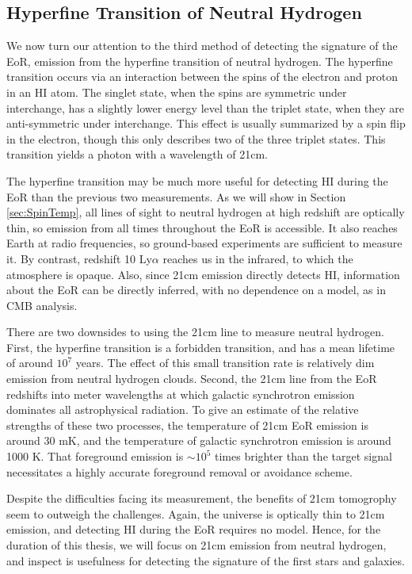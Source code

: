\subsection{Hyperfine Transition of Neutral Hydrogen}

We now turn our attention to the third method of detecting the signature of the EoR, emission from the
hyperfine transition of neutral hydrogen. The hyperfine transition occurs via an
interaction between the spins of the electron and proton in an HI atom. The singlet state, when the
spins are symmetric under interchange, has a slightly lower energy level than the triplet state, when
they are anti-symmetric under interchange. This effect is usually summarized by a spin flip in the
electron, though this only describes two of the three triplet states. This transition
yields a photon with a wavelength of 21cm.

The hyperfine transition may be much more useful for detecting HI during the EoR than the previous 
two measurements. As we will show in Section \ref{sec:SpinTemp}, all lines of sight to
neutral hydrogen at high redshift are optically thin, so emission from all times throughout the EoR
is accessible. It also reaches Earth at radio frequencies, so ground-based experiments are
sufficient to measure it. By contrast, redshift 10 Ly$\alpha$ reaches us in the infrared, to
which the atmosphere is opaque. Also, since 21cm emission directly detects HI,
information about the EoR can be directly inferred, with no dependence on a model, as in CMB
analysis.

There are two downsides to using the 21cm line to measure neutral hydrogen. First, the hyperfine
transition is a forbidden transition, and has a mean lifetime of around $10^7$ years. The effect of
this small transition rate is relatively dim emission from neutral hydrogen clouds. Second, the
21cm line from the EoR redshifts into meter wavelengths at which galactic synchrotron emission
dominates all astrophysical radiation. To give an estimate of the relative strengths of these two
processes, the temperature of 21cm EoR emission is around 30 mK, and the temperature of galactic
synchrotron emission is around 1000 K. That foreground emission is $\sim10^5$ times brighter than the
target signal necessitates a highly accurate foreground removal or avoidance scheme. 

Despite the difficulties facing its measurement, the benefits of 21cm tomogrophy seem to outweigh
the challenges. Again, the universe is optically thin to 21cm emission, and detecting HI during the
EoR requires no model. Hence, for the duration of this thesis, we will focus on 21cm emission from 
neutral hydrogen, and inspect is usefulness for detecting the signature of the first stars and galaxies.

